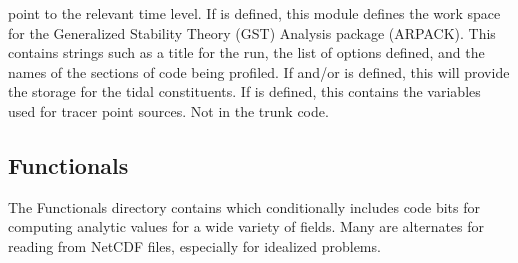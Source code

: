 \begin{klist}
    point to the relevant time level.
   If  is
    defined, this module defines the work space for the Generalized
    Stability Theory (GST) Analysis package (ARPACK).
   This contains strings such as a title for the run,
    the list of  options defined, and the names of the sections of
    code being profiled.
    If  and/or  is
    defined, this will provide the storage for the tidal constituents.
   If 
    is defined, this contains the variables used
    for tracer point sources. Not in the trunk code.
\end{klist}

\subsection{Functionals}
\label{Functionals}
The Functionals directory contains  which
conditionally includes code bits for computing analytic values for a
wide variety of fields. Many are alternates for reading from NetCDF
files, especially for idealized problems.
